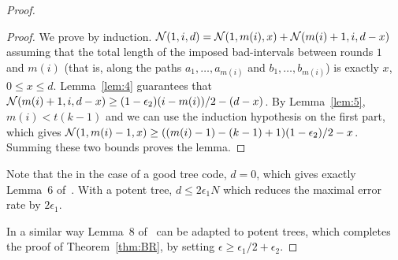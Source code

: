 \documentclass[ letterpaper, 11pt]{article}
\newcommand{\potent}{potent\xspace}
\begin{document}
\begin{proof}
\begin{proof}
We prove by induction. ${\cal N}(1,i,d)={\cal N}(1,m(i),x)+{\cal N}(m(i)+1,i,d-x)$
assuming that the total length of the imposed bad-intervals between
rounds $1$ and $m(i)$ (that is, along the paths $a_1,\ldots,a_{m(i)}$ and $b_1,\ldots,b_{m(i)}$)
is exactly $x$, $0\le x \le d$.
Lemma~\ref{lem:4} guarantees that ${\cal N}{(m(i)+1,i,d-x)}\ge (1-\epsilon_2)(i-m(i))/2-(d-x)$.
By Lemma~\ref{lem:5}, $m(i)<t(k-1)$ and we can use the induction hypothesis on the first part, which gives
${\cal N}(1,m(i)-1,x)\ge ((m(i)-1) - (k-1) +1)(1-\epsilon_2)/2-x$. Summing these two bounds proves the lemma.
\end{proof}
\noindent Note that the in the case of a good tree code, $d=0$, which gives exactly Lemma~6 of~\cite{BR10}. With a \potent tree, $d\le2\epsilon_1N$ which reduces the maximal error rate by $2\epsilon_1$.

In a similar way Lemma~8 of~\cite{BR10} can be adapted to potent trees, which completes the proof of Theorem~\ref{thm:BR}, by setting $\epsilon \ge \epsilon_1/2+\epsilon_2$.

\end{proof}
\end{document}
